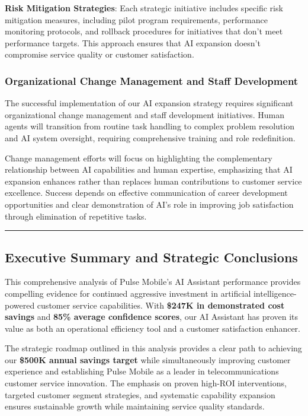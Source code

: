 \documentclass[
  letterpaper,
  DIV=11,
  numbers=noendperiod]{scrartcl}
\begin{document}
\textbf{Risk Mitigation Strategies}: Each strategic initiative includes
specific risk mitigation measures, including pilot program requirements,
performance monitoring protocols, and rollback procedures for
initiatives that don't meet performance targets. This approach ensures
that AI expansion doesn't compromise service quality or customer
satisfaction.

\subsubsection{Organizational Change Management and Staff
Development}\label{organizational-change-management-and-staff-development}

The successful implementation of our AI expansion strategy requires
significant organizational change management and staff development
initiatives. Human agents will transition from routine task handling to
complex problem resolution and AI system oversight, requiring
comprehensive training and role redefinition.

Change management efforts will focus on highlighting the complementary
relationship between AI capabilities and human expertise, emphasizing
that AI expansion enhances rather than replaces human contributions to
customer service excellence. Success depends on effective communication
of career development opportunities and clear demonstration of AI's role
in improving job satisfaction through elimination of repetitive tasks.

\begin{center}\rule{0.5\linewidth}{0.5pt}\end{center}

\subsection{Executive Summary and Strategic
Conclusions}\label{executive-summary-and-strategic-conclusions}

This comprehensive analysis of Pulse Mobile's AI Assistant performance
provides compelling evidence for continued aggressive investment in
artificial intelligence-powered customer service capabilities. With
\textbf{\$247K in demonstrated cost savings} and \textbf{85\% average
confidence scores}, our AI Assistant has proven its value as both an
operational efficiency tool and a customer satisfaction enhancer.

The strategic roadmap outlined in this analysis provides a clear path to
achieving our \textbf{\$500K annual savings target} while simultaneously
improving customer experience and establishing Pulse Mobile as a leader
in telecommunications customer service innovation. The emphasis on
proven high-ROI interventions, targeted customer segment strategies, and
systematic capability expansion ensures sustainable growth while
maintaining service quality standards.
\end{document}
